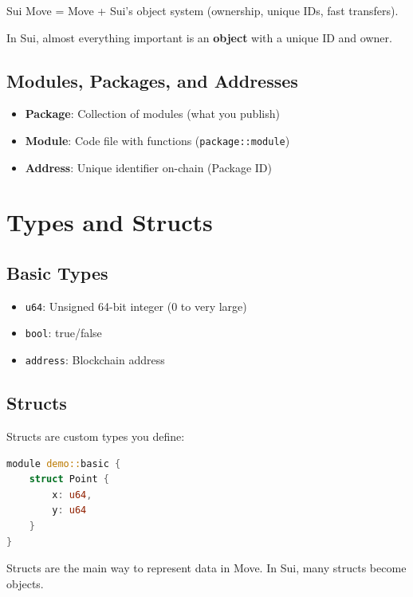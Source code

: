 \documentclass[11pt]{article}
\begin{document}
Sui Move = Move + Sui's object system (ownership, unique IDs, fast transfers).

\begin{noteBox}
In Sui, almost everything important is an \textbf{object} with a unique ID and owner.
\end{noteBox}

\subsection{Modules, Packages, and Addresses}

\begin{itemize}
  \item \textbf{Package}: Collection of modules (what you publish)
  \item \textbf{Module}: Code file with functions (\texttt{package::module})
  \item \textbf{Address}: Unique identifier on-chain (Package ID)
\end{itemize}

\section{Types and Structs}

\subsection{Basic Types}

\begin{itemize}
  \item \texttt{u64}: Unsigned 64-bit integer (0 to very large)
  \item \texttt{bool}: true/false
  \item \texttt{address}: Blockchain address
\end{itemize}

\subsection{Structs}

Structs are custom types you define:

\begin{lstlisting}[language=Rust]
module demo::basic {
    struct Point {
        x: u64,
        y: u64
    }
}
\end{lstlisting}

\begin{noteBox}
Structs are the main way to represent data in Move. In Sui, many structs become objects.
\end{noteBox}
\end{document}
